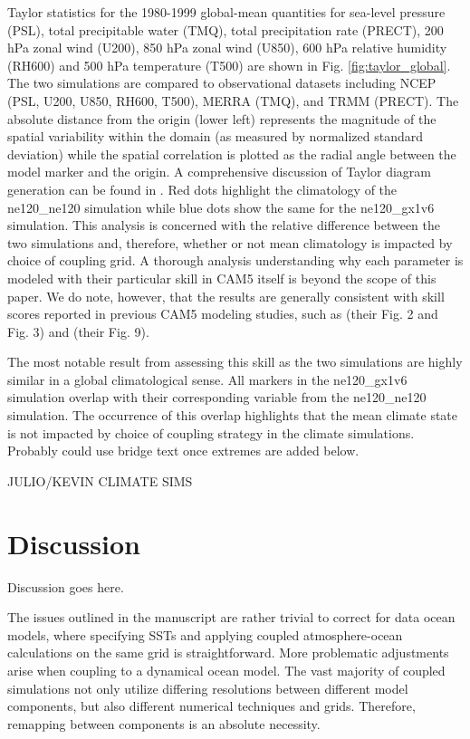 \documentclass[draft,ms]{AGUTeX}
\begin{document}
\begin{article}
Taylor statistics for the 1980-1999 global-mean quantities for sea-level pressure (PSL), total precipitable water (TMQ), total precipitation rate (PRECT), 200 hPa zonal wind (U200), 850 hPa zonal wind (U850), 600 hPa relative humidity (RH600) and 500 hPa temperature (T500) are shown in Fig. \ref{fig:taylor_global}. The two simulations are compared to observational datasets including NCEP \citep{Kalnay1996} (PSL, U200, U850, RH600, T500), MERRA \citep{Rienecker2011} (TMQ), and TRMM \citep{TRMM3B43} (PRECT). The absolute distance from the origin (lower left) represents the magnitude of the spatial variability within the domain (as measured by normalized standard deviation) while the spatial correlation is plotted as the radial angle between the model marker and the origin. A comprehensive discussion of Taylor diagram generation can be found in \citet{Taylor2001}. Red dots highlight the climatology of the ne120\_ne120 simulation while blue dots show the same for the ne120\_gx1v6 simulation. This analysis is  concerned with the relative difference between the two simulations and, therefore, whether or not mean climatology is impacted by choice of coupling grid. A thorough analysis understanding why each parameter is modeled with their particular skill in CAM5 itself is beyond the scope of this paper. We do note, however, that the results are generally consistent with skill scores reported in previous CAM5 modeling studies, such as \citet{Bacmeister2014} (their Fig. 2 and Fig. 3) and \citet{Zarzycki2015AMIP} (their Fig. 9).

The most notable result from assessing this skill as the two simulations are highly similar in a global climatological sense. All markers in the ne120\_gx1v6 simulation overlap with their corresponding variable from the ne120\_ne120 simulation. The occurrence of this overlap highlights that the mean climate state is not impacted by choice of coupling strategy in the climate simulations. {\color{red} Probably could use bridge text once extremes are added below.}

{\color{red} JULIO/KEVIN CLIMATE SIMS}


\section{Discussion}
\label{sec:discussion}

{\color{red} Discussion goes here.}

The issues outlined in the manuscript are rather trivial to correct for data ocean models, where specifying SSTs and applying coupled atmosphere-ocean calculations on the same grid is straightforward. More problematic adjustments arise when coupling to a dynamical ocean model. The vast majority of coupled simulations not only utilize differing resolutions between different model components, but also different numerical techniques and grids. Therefore, remapping between components is an absolute necessity.


\end{article}
\end{document}
